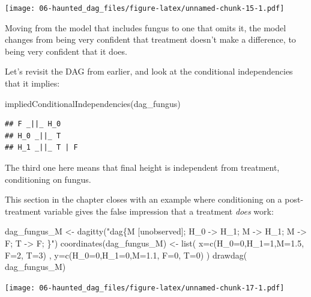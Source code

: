 \documentclass[
]{book}
\newenvironment{Shaded}{\begin{snugshade}}{\end{snugshade}}
\newcommand{\AttributeTok}[1]{\textcolor[rgb]{0.77,0.63,0.00}{#1}}
\newcommand{\DecValTok}[1]{\textcolor[rgb]{0.00,0.00,0.81}{#1}}
\newcommand{\FloatTok}[1]{\textcolor[rgb]{0.00,0.00,0.81}{#1}}
\newcommand{\FunctionTok}[1]{\textcolor[rgb]{0.00,0.00,0.00}{#1}}
\newcommand{\NormalTok}[1]{#1}
\newcommand{\OtherTok}[1]{\textcolor[rgb]{0.56,0.35,0.01}{#1}}
\newcommand{\StringTok}[1]{\textcolor[rgb]{0.31,0.60,0.02}{#1}}
\begin{document}
\texttt{[image: 06-haunted\_dag\_files/figure-latex/unnamed-chunk-15-1.pdf]}

Moving from the model that includes fungus to one that omits it, the model changes from being very confident that treatment doesn't make a difference, to being very confident that it does.

Let's revisit the DAG from earlier, and look at the conditional independencies that it implies:

\begin{Shaded}
\begin{Highlighting}[]
\FunctionTok{impliedConditionalIndependencies}\NormalTok{(dag\_fungus)}
\end{Highlighting}
\end{Shaded}

\begin{verbatim}
## F _||_ H_0
## H_0 _||_ T
## H_1 _||_ T | F
\end{verbatim}

The third one here means that final height is independent from treatment, conditioning on fungus.

This section in the chapter closes with an example where conditioning on a post-treatment variable gives the false impression that a treatment \emph{does} work:

\begin{Shaded}
\begin{Highlighting}[]
\NormalTok{dag\_fungus\_M }\OtherTok{\textless{}{-}} \FunctionTok{dagitty}\NormalTok{(}\StringTok{"dag\{M [unobserved]; H\_0 {-}\textgreater{} H\_1; M {-}\textgreater{} H\_1; M {-}\textgreater{} F; T {-}\textgreater{} F; \}"}\NormalTok{)}
\FunctionTok{coordinates}\NormalTok{(dag\_fungus\_M) }\OtherTok{\textless{}{-}} \FunctionTok{list}\NormalTok{( }\AttributeTok{x=}\FunctionTok{c}\NormalTok{(}\AttributeTok{H\_0=}\DecValTok{0}\NormalTok{,}\AttributeTok{H\_1=}\DecValTok{1}\NormalTok{,}\AttributeTok{M=}\FloatTok{1.5}\NormalTok{, }\AttributeTok{F=}\DecValTok{2}\NormalTok{, }\AttributeTok{T=}\DecValTok{3}\NormalTok{) , }\AttributeTok{y=}\FunctionTok{c}\NormalTok{(}\AttributeTok{H\_0=}\DecValTok{0}\NormalTok{,}\AttributeTok{H\_1=}\DecValTok{0}\NormalTok{,}\AttributeTok{M=}\FloatTok{1.1}\NormalTok{, }\AttributeTok{F=}\DecValTok{0}\NormalTok{, }\AttributeTok{T=}\DecValTok{0}\NormalTok{) )}
\FunctionTok{drawdag}\NormalTok{( dag\_fungus\_M)}
\end{Highlighting}
\end{Shaded}

\texttt{[image: 06-haunted\_dag\_files/figure-latex/unnamed-chunk-17-1.pdf]}
\end{document}
